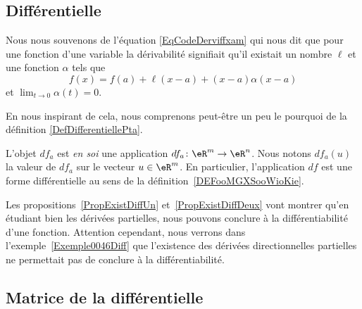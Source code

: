 \subsection{Différentielle}

Nous nous souvenons de l'équation \eqref{EqCodeDerviffxam} qui nous dit que pour une fonction d'une variable la dérivabilité signifiait qu'il existait un nombre \( \ell\) et une fonction \( \alpha\) tels que
\begin{equation}
	f(x)=f(a)+\ell(x-a)+(x-a)\alpha(x-a)
\end{equation}
et \( \lim_{t\to 0} \alpha(t)=0\).

En nous inspirant de cela, nous comprenons peut-être un peu le pourquoi de la définition \ref{DefDifferentiellePta}.

\begin{normaltext}
	L'objet \( df_a\) est \emph{en soi} une application \( df_a\colon \eR^m\to \eR^n\). Nous notons \( df_a(u)\) la valeur de \( df_a\) sur le vecteur \( u\in\eR^m\). En particulier, l'application \( df\) est une forme différentielle au sens de la définition~\ref{DEFooMGXSooWioKie}.
\end{normaltext}

\begin{normaltext}
	Les propositions~\ref{PropExistDiffUn} et~\ref{PropExistDiffDeux} vont montrer qu'en étudiant bien les dérivées partielles, nous pouvons conclure à la différentiabilité d'une fonction.
	Attention cependant, nous verrons dans l'exemple~\ref{Exemple0046Diff} que l'existence des dérivées directionnelles partielles ne permettait pas de conclure à la différentiabilité.
\end{normaltext}

\subsection{Matrice de la différentielle}

